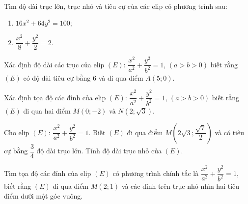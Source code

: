\begin{bt}%
	Tìm độ dài trục lớn, trục nhỏ và tiêu cự của các elip có phương trình sau:
	\begin{multicols}{2}
		\begin{enumerate}
			\item $16x^2+64y^2=100$;
			\item  $\dfrac{x^2}{8} + \dfrac{y^2}{2} = 2$.
		\end{enumerate}
	\end{multicols}
\end{bt}

\begin{bt}%
	Xác định độ dài các trục của elip $(E)$: $\dfrac{x^2}{a^2} + \dfrac{y^2}{b^2} = 1$, $(a>b>0)$ biết rằng $(E)$ có độ dài tiêu cự bằng $6$ và đi qua điểm $A(5;0)$.
\end{bt}

\begin{bt}%
	Xác định tọa độ các đỉnh của elip $(E)$: $\dfrac{x^2}{a^2} + \dfrac{y^2}{b^2} = 1$, $(a>b>0)$ biết rằng $(E)$ đi qua hai điểm $M(0;-2)$ và $N(2;\sqrt{3})$.
\end{bt}

\begin{bt}%
	Cho elip $(E)$: $\dfrac{x^2}{a^2} + \dfrac{y^2}{b^2} = 1$. Biết $(E)$ đi qua điểm $M\left(2\sqrt{3};\dfrac{\sqrt{7}}{2}\right)$ và có tiêu cự bằng $\dfrac{3}{4}$ độ dài trục lớn. Tính độ dài trục nhỏ của $(E)$.
\end{bt}


\begin{bt}%
	Tìm tọa độ các đỉnh của elip $(E)$ có phương trình chính tắc là $\dfrac{x^2}{a^2} + \dfrac{y^2}{b^2} = 1$, biết rằng $(E)$ đi qua điểm $M(2;1)$ và các đỉnh trên trục nhỏ nhìn hai tiêu điểm dưới một góc vuông.
\end{bt}


